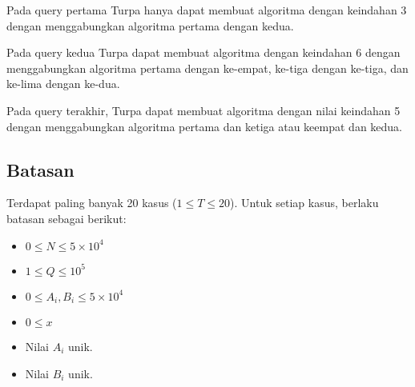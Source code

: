 \documentclass{article}
\begin{document}
\par Pada query pertama Turpa hanya dapat membuat algoritma dengan keindahan 3 dengan menggabungkan algoritma pertama dengan kedua.
\par Pada query kedua Turpa dapat membuat algoritma dengan keindahan 6 dengan menggabungkan algoritma pertama dengan ke-empat, ke-tiga dengan ke-tiga, dan ke-lima dengan ke-dua.
\par Pada query terakhir, Turpa dapat membuat algoritma dengan nilai keindahan 5 dengan menggabungkan algoritma pertama dan ketiga atau keempat dan kedua.

\subsection*{Batasan}

\par Terdapat paling banyak 20 kasus ($1 \leq T \leq 20$). Untuk setiap kasus, berlaku batasan sebagai berikut:
\begin{itemize}
	\item $0 \leq N \leq 5\times 10^4$
	\item $1 \leq Q \leq 10^5$
	\item $0 \leq A_i,B_i \leq 5\times 10^4$
	\item $0 \leq x$
	\item Nilai $A_i$ unik.
	\item Nilai $B_i$ unik.
\end{itemize}
\end{document}
